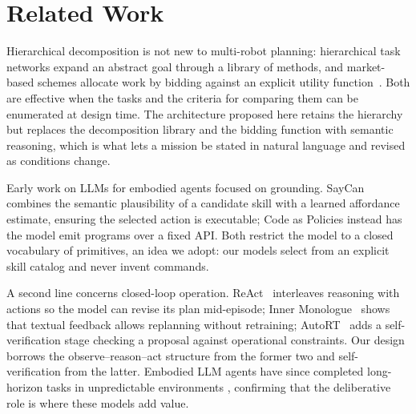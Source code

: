 \documentclass[conference]{IEEEtran}
\begin{document}
\section{Related Work}

Hierarchical decomposition is not new to multi-robot planning:
hierarchical task networks expand an abstract goal through a library of
methods, and market-based schemes allocate work by bidding against an
explicit utility function~\cite{gerkey2004,korsah2013}. Both are
effective when the tasks and the criteria for comparing them can be
enumerated at design time. The architecture proposed here retains the
hierarchy but replaces the decomposition library and the bidding function
with semantic reasoning, which is what lets a mission be stated in
natural language and revised as conditions change.

Early work on LLMs for embodied agents focused on grounding. SayCan
\cite{ahn2022} combines the semantic plausibility of a candidate skill
with a learned affordance estimate, ensuring the selected action is
executable; Code as Policies \cite{liang2023} instead has the model emit
programs over a fixed API. Both restrict the model to a closed vocabulary
of primitives, an idea we adopt: our models select from an explicit skill
catalog and never invent commands.

A second line concerns closed-loop operation. ReAct~\cite{yao2022}
interleaves reasoning with actions so the model can revise its plan
mid-episode; Inner Monologue~\cite{huang2022} shows that textual feedback
allows replanning without retraining; AutoRT~\cite{brohan2024} adds a
self-verification stage checking a proposal against operational
constraints. Our design borrows the observe--reason--act structure from
the former two and self-verification from the latter. Embodied LLM agents
have since completed long-horizon tasks in unpredictable environments
\cite{monwilliams2025}, confirming that the deliberative role is where
these models add value.
\end{document}

